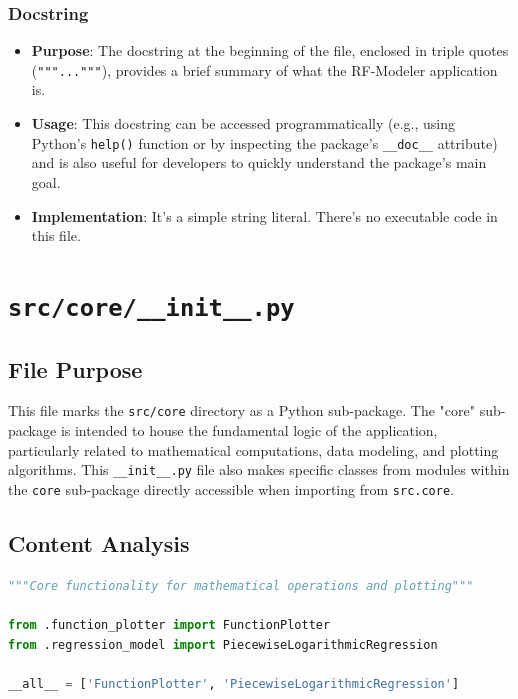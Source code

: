 \documentclass[12pt,a4paper]{report}
\begin{document}
\subsubsection{Docstring}
\begin{itemize}
    \item \textbf{Purpose}: The docstring at the beginning of the file, enclosed in triple quotes (\texttt{"""..."""}), provides a brief summary of what the RF-Modeler application is.
    \item \textbf{Usage}: This docstring can be accessed programmatically (e.g., using Python's \texttt{help()} function or by inspecting the package's \texttt{\_\_doc\_\_} attribute) and is also useful for developers to quickly understand the package's main goal.
    \item \textbf{Implementation}: It's a simple string literal. There's no executable code in this file.
\end{itemize}

\section{\texttt{src/core/\_\_init\_\_.py}}
\subsection{File Purpose}
This file marks the \texttt{src/core} directory as a Python sub-package. The "core" sub-package is intended to house the fundamental logic of the application, particularly related to mathematical computations, data modeling, and plotting algorithms. This \texttt{\_\_init\_\_.py} file also makes specific classes from modules within the \texttt{core} sub-package directly accessible when importing from \texttt{src.core}.

\subsection{Content Analysis}
\begin{lstlisting}[language=Python, caption={Content of src/core/\_\_init\_\_.py}, basicstyle=\\ttfamily\\footnotesize]
"""Core functionality for mathematical operations and plotting"""

from .function_plotter import FunctionPlotter
from .regression_model import PiecewiseLogarithmicRegression

__all__ = ['FunctionPlotter', 'PiecewiseLogarithmicRegression']
\end{lstlisting}
\end{document}
